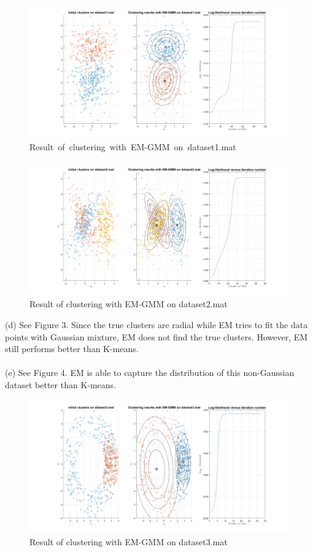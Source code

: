 \documentclass[12pt]{article}
\begin{document}
\begin{figure}[H]
\centering
\includegraphics[width = 1\textwidth]{41b.png}
\caption{Result\ of\ clustering\ with\ EM-GMM\ on\ dataset1.mat}
\end{figure}

\begin{figure}[H]
\centering
\includegraphics[width = 1\textwidth]{41c.png}
\caption{Result of clustering with EM-GMM on dataset2.mat}
\end{figure}

\vfill
\clearpage


\noindent(d) See Figure 3. Since the true clusters are radial while EM tries to fit the data points with Gaussian mixture, EM does not find the true clusters. However, EM still performs better than K-means.\\
\\
(e) See Figure 4. EM is able to capture the distribution of this non-Gaussian dataset better than K-means. 

\begin{figure}[H]
\centering
\includegraphics[width = 1\textwidth]{41d.png}
\caption{Result of clustering with EM-GMM on dataset3.mat}
\end{figure}
\end{document}
